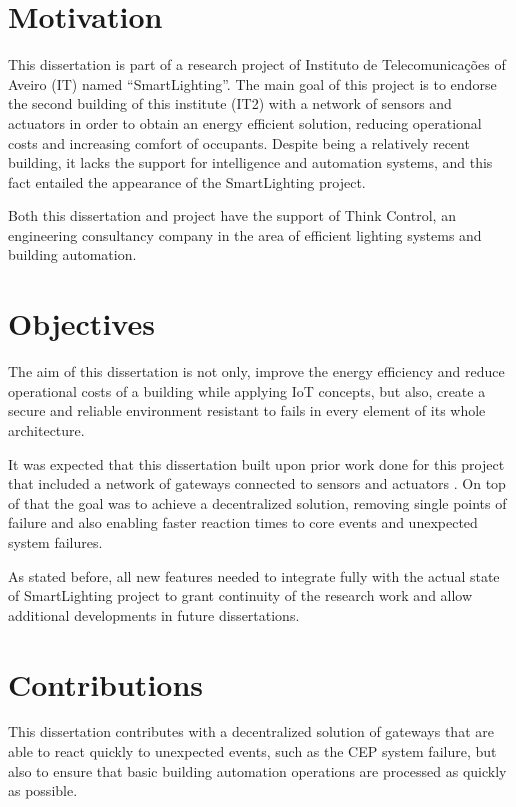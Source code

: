 \section{Motivation}

This dissertation is part of a research project of Instituto de Telecomunicações of Aveiro (IT) named ``SmartLighting''. The main goal of this project is to endorse the second building of this institute (IT2) with a network of sensors and actuators in order to obtain an energy efficient solution, reducing operational costs and increasing comfort of occupants. Despite being a relatively recent building, it lacks the support for intelligence and automation systems, and this fact entailed the appearance of the SmartLighting project.

Both this dissertation and project have the support of Think Control, an engineering consultancy company in the area of efficient lighting systems and building automation.


\section{Objectives}

The aim of this dissertation is not only, improve the energy efficiency and reduce operational costs of a building while applying IoT concepts, but also, create a secure and reliable environment resistant to fails in every element of its whole architecture.

It was expected that this dissertation built upon prior work done for this project that included a network of gateways connected to sensors and actuators \cite{helder}. On top of that the goal was to achieve a decentralized solution, removing single points of failure and also enabling faster reaction times to core events and unexpected system failures.

As stated before, all new features needed to integrate fully with the actual state of SmartLighting project to grant continuity of the research work and allow additional developments in future dissertations.


\section{Contributions}

This dissertation contributes with a decentralized solution of gateways that are able to react quickly to unexpected events, such as the CEP system failure, but also to ensure that basic building automation operations are processed as quickly as possible.

